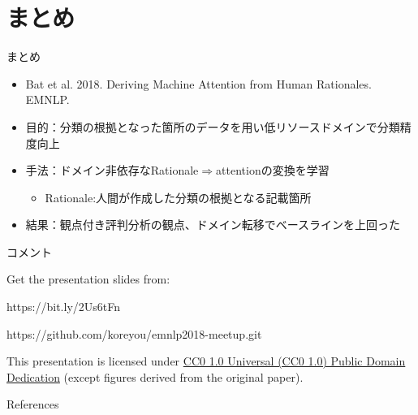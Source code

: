 \section{まとめ}
\frame[standout]{\insertsection}

\begin{frame}{まとめ}
\begin{itemize}
\item Bat et al. 2018. Deriving Machine Attention from Human Rationales. EMNLP.
\item 目的：分類の根拠となった箇所のデータを用い低リソースドメインで分類精度向上
\item 手法：ドメイン非依存なRationale$\Rightarrow$attentionの変換を学習
\begin{itemize}
\item Rationale:人間が作成した分類の根拠となる記載箇所
\end{itemize}
\item 結果：観点付き評判分析の観点、ドメイン転移でベースラインを上回った
\end{itemize}
\end{frame}

\begin{frame}{コメント}

\end{frame}


\begin{frame}[c]

  Get the presentation slides from:

  \begin{center}https://bit.ly/2Us6tFn\end{center}
  \begin{center}https://github.com/koreyou/emnlp2018-meetup.git\end{center}

  This presentation is licensed under
    \href{https://creativecommons.org/publicdomain/zero/1.0/}{
    CC0 1.0 Universal (CC0 1.0) Public Domain Dedication}
    {\scriptsize (except figures derived from the original paper\cite{bao_2018})}.

  \begin{center}\cczero\end{center}

\end{frame}

\begin{frame}[allowframebreaks]{References}
  \printbibliography[heading=none]
\end{frame}



